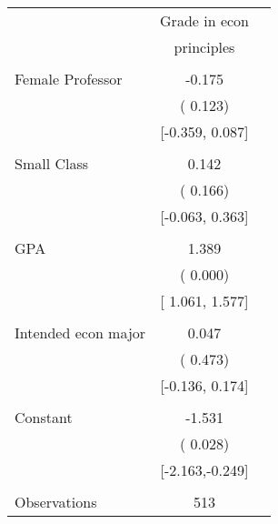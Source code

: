 \begin{tabular}{lcc} \toprule
& Grade in econ  \tabularnewline
& principles \tabularnewline \midrule
&  \tabularnewline
Female Professor & -0.175 \tabularnewline
& ( 0.123) &\tabularnewline
& {[}-0.359, 0.087{]} \tabularnewline
& \tabularnewline
Small Class &  0.142 \tabularnewline
& ( 0.166) \tabularnewline
& {[}-0.063, 0.363{]} \tabularnewline
&  \tabularnewline
GPA &  1.389 \tabularnewline
& ( 0.000) \tabularnewline
& {[} 1.061, 1.577{]} \tabularnewline
&  \tabularnewline
Intended econ major &  0.047 \tabularnewline
& ( 0.473) \tabularnewline
& {[}-0.136, 0.174{]} \tabularnewline
&  \tabularnewline
Constant  & -1.531 \tabularnewline
& ( 0.028) \tabularnewline
& {[}-2.163,-0.249{]} \tabularnewline
&  \tabularnewline
Observations & 513 \tabularnewline
\bottomrule \bottomrule
\end{tabular}
